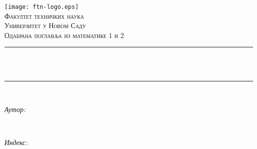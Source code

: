 \begin{titlepage}
	\centering
    \vspace*{0.5 cm}
    \texttt{[image: ftn-logo.eps]}\\[1.0 cm]	                %
    \textsc{\LARGE Факултет техничких наука}\\[0.5 cm]	                    %
	\textsc{\Large Универзитет у Новом Саду}\\[1.0 cm]				        %
	\textsc{\large Одабрана поглавља из математике 1 и 2}\\[0.5 cm]		%
	\rule{\linewidth}{0.2 mm} \\[0.4 cm]
	{ \huge \bfseries \thetitle}\\
	\rule{\linewidth}{0.2 mm} \\[1.5 cm]
	
	\begin{minipage}{0.4\textwidth}
		\begin{flushleft} \large
			\emph{Аутор:}\\
			\theauthor
			\end{flushleft}
			\end{minipage}~
			\begin{minipage}{0.4\textwidth}
			\begin{flushright} \large
			\emph{Индекс:} \\
			\theindex								                        %
		\end{flushright}
	\end{minipage}\\[2.0 cm]
	
	{\large \thedate}\\[2 cm]
	\vfill
\end{titlepage}